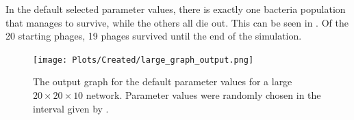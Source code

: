 In the default selected parameter values, there is exactly one bacteria population that manages to survive, while the others all die out. 
This can be seen in . 
Of the 20 starting phages, 19 phages survived until the end of the simulation. 

\begin{figure}[]
    \texttt{[image: Plots/Created/large\_graph\_output.png]}
    \centering
    \caption{
        The output graph for the default parameter values for a large $20\times 20 \times 10$ network. 
        Parameter values were randomly chosen in the interval given by . 
    \label{fig:created:large_graph_output}
    }
\end{figure}